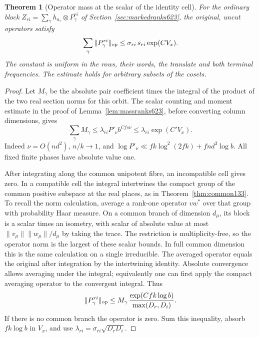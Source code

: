 \documentclass[a4paper,11pt]{article}
\newtheorem{theorem}[proposition]{Theorem}
\theoremstyle{definition}
\theoremstyle{remark}
\numberwithin{equation}{section}
\begin{document}
\begin{theorem}[Operator mass at the scalar of the identity cell]
\leavevmode\label{thm:compactmass630}
For the ordinary block \(Z_{ri}=\sum_\gamma h_{a_\gamma}
\otimes P_\gamma^{ri}\) of Section~\ref{sec:markedranks623},
the original, uncut operators satisfy
\[
             \sum_\gamma\|P_\gamma^{ri}\|_{\rm op}
                     \le \sigma_{ri}\,s_{ri}\exp(CV_x).
\]
The constant is uniform in the rows, their words, the translate
and both terminal frequencies. The estimate holds for arbitrary
subsets of the cosets.
\end{theorem}
\begin{proof}
Let \(M_\gamma\) be the absolute pair coefficient times the
integral of the product of the two real section norms for this
orbit. The scalar counting and moment estimate in the proof of
Lemma~\ref{lem:massranks623}, before converting column dimensions,
gives
\[
      \sum_\gamma M_\gamma
        \le\lambda_{ri} P'_\nu b^{Cfs\nu}
        \le\lambda_{ri}\exp(C'V_x).
\]
Indeed \(\nu=O(nd^2)\), \(n/k\to1\), and
\(\log P'_\nu\ll fk\log^2(2fk)+fnd^3\log b\).
All fixed finite phases have absolute value one.

After integrating along the common unipotent fibre, an incompatible
cell gives zero. In a compatible cell the integral intertwines the
compact group of the common positive subspace at the real places,
as in Theorem~\ref{thm:common133}. To recall the norm calculation,
average a rank-one operator \(vw^*\) over that group with probability
Haar measure. On a common branch of dimension \(d_\mu\), its block
is a scalar times an isometry, with scalar of absolute value at most
\(\|v_\mu\|\|w_\mu\|/d_\mu\) by taking the trace. The restriction
is multiplicity-free, so the operator norm is the largest of these
scalar bounds. In full common dimension this is the same calculation
on a single irreducible. The averaged operator equals the original
after integration by the intertwining identity. Absolute convergence
allows averaging under the integral; equivalently one can first
apply the compact averaging operator to the convergent integral.
Thus
\[
       \|P_\gamma^{ri}\|_{\rm op}
             \le M_\gamma\,\frac{\exp(Cfk\log b)}{\max(D_r,D_i)} .
\]
If there is no common branch the operator is zero.
Sum this inequality, absorb \(fk\log b\) in \(V_x\), and use
\(\lambda_{ri}=\sigma_{ri}\sqrt{D_rD_i}\).
\end{proof}
\end{document}
